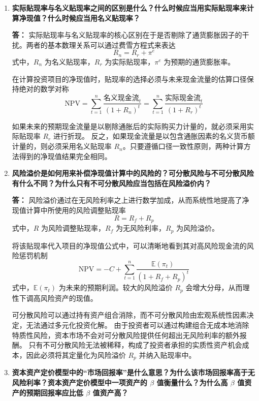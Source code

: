 \begin{enumerate}[label=\textbf{\arabic*.}, leftmargin=*]
		当市场利率下降时，由于未来固定票息流的贴现率变低，现值随之提高，从而在市场上表现为当前的债券价格上升。
		债券价格会持续调整，直至其蕴含的有效收益率重新与下降后的市场利率达成跨期套利均衡。
		\newpage
		\item \textbf{实际贴现率与名义贴现率之间的区别是什么？什么时候应当用实际贴现率来计算净现值？什么时候应当用名义贴现率？}
		
		\textbf{答：}
		实际贴现率与名义贴现率的核心区别在于是否剔除了通货膨胀因子的干扰。两者的基本数理关系可以通过费雪方程式来表达
		\[
		R_n = R_r + \pi^e
		\]
		式中，$R_n$ 为名义贴现率，$R_r$ 为实际贴现率，$\pi^e$ 为预期的通货膨胀率。
		
		在计算投资项目的净现值时，贴现率的选择必须与未来现金流量的估算口径保持绝对的数学对称
		\[
		\text{NPV} = \sum_{t=1}^n \frac{\text{名义现金流}_t}{(1+R_n)^t} = \sum_{t=1}^n \frac{\text{实际现金流}_t}{(1+R_r)^t}
		\]
		
		如果未来的预期现金流量是以剔除通胀后的实际购买力计量的，就必须采用实际贴现率 $R_r$ 进行折现。
		反之，如果现金流量是以包含通胀因素的名义货币额计量的，则必须采用名义贴现率 $R_n$。只要遵循口径一致性原则，两种计算方法得到的净现值结果完全相同。
		
		\item \textbf{风险溢价是如何用来补偿净现值计算中的风险的？可分散风险与不可分散风险有什么不同？为什么只有不可分散风险应当包括在风险溢价内？}
		
		\textbf{答：}
		风险溢价通过在无风险利率之上进行数学加成，从而系统性地提高了净现值计算中所使用的风险调整贴现率
		\[
		R = R_f + R_p
		\]
		式中，$R$ 为风险调整贴现率，$R_f$ 为无风险利率，$R_p$ 为风险溢价。
		
		将该贴现率代入项目的净现值公式中，可以清晰地看到其对高风险现金流的风险惩罚机制
		\[
		\text{NPV} = -C + \sum_{t=1}^n \frac{\mathbb{E}(\pi_t)}{(1 + R_f + R_p)^t}
		\]
		式中，$\mathbb{E}(\pi_t)$ 为未来的预期利润。较大的风险溢价 $R_p$ 会增大分母，从而理性下调高风险资产的现值。
		
		可分散风险可以通过持有资产组合消除，而不可分散风险由宏观系统性因素决定，无法通过多元化投资化解。
		由于投资者可以通过构建组合无成本地消除特质性风险，资本市场不会对可分散风险提供任何超出无风险利率的额外报酬。
		只有不可分散风险无法被稀释，构成了投资者承担的实质性资产机会成本，因此必须将其定量化为风险溢价 $R_p$ 并纳入贴现率中。
		
		\item \textbf{资本资产定价模型中的“市场回报率”是什么意思？为什么该市场回报率高于无风险利率？资本资产定价模型中一项资产的 $\beta$ 值衡量什么？为什么高 $\beta$ 值资产的预期回报率应比低 $\beta$ 值资产高？}
		

\end{enumerate}
